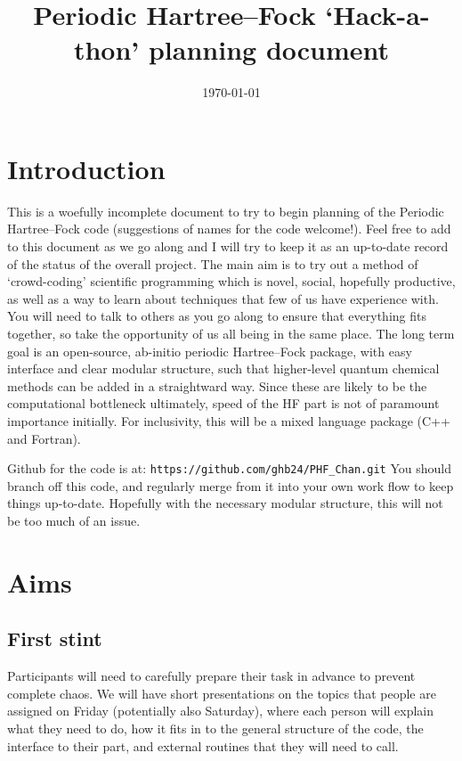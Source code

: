 \documentclass{report}
\begin{document}
\title{Periodic Hartree--Fock `Hack-a-thon' planning document}
\date{\today}
\maketitle

\section{Introduction}

This is a woefully incomplete document to try to begin planning of the Periodic Hartree--Fock code (suggestions of names for the code welcome!). 
Feel free to add to this document as we go along and I will try to keep it as an up-to-date record of the status of the overall project.
The main aim is to try out a method of `crowd-coding' scientific programming which is novel, social, hopefully productive, as well as a way to learn about techniques that few of us have experience with. 
You will need to talk to others as you go along to ensure that everything fits together, so take the opportunity of us all being in the same place.
The long term goal is an open-source, ab-initio periodic Hartree--Fock package, with easy interface and clear modular structure, such that higher-level quantum
chemical methods can be added in a straightward way. Since these are likely to be the computational bottleneck ultimately, speed of the HF part is
not of paramount importance initially. For inclusivity, this will be a mixed language package (C++ and Fortran).

Github for the code is at: {\tt https://github.com/ghb24/PHF\_Chan.git}
You should branch off this code, and regularly merge from it into your own work flow to keep things up-to-date. Hopefully with the necessary modular structure, this will not
be too much of an issue.

\section{Aims}

\subsection{First stint}

Participants will need to carefully prepare their task in advance to prevent complete chaos. 
We will have short presentations on the topics that people are assigned on Friday (potentially also Saturday), 
where each person will explain what they need to do, how it fits in to the general structure of the code, 
the interface to their part, and external routines that they will need to call.
\end{document}
